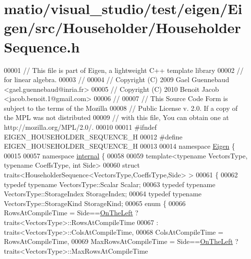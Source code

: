 \hypertarget{matio_2visual__studio_2test_2eigen_2_eigen_2src_2_householder_2_householder_sequence_8h_source}{}\section{matio/visual\+\_\+studio/test/eigen/\+Eigen/src/\+Householder/\+Householder\+Sequence.h}
\label{matio_2visual__studio_2test_2eigen_2_eigen_2src_2_householder_2_householder_sequence_8h_source}

\begin{DoxyCode}
00001 \textcolor{comment}{// This file is part of Eigen, a lightweight C++ template library}
00002 \textcolor{comment}{// for linear algebra.}
00003 \textcolor{comment}{//}
00004 \textcolor{comment}{// Copyright (C) 2009 Gael Guennebaud <gael.guennebaud@inria.fr>}
00005 \textcolor{comment}{// Copyright (C) 2010 Benoit Jacob <jacob.benoit.1@gmail.com>}
00006 \textcolor{comment}{//}
00007 \textcolor{comment}{// This Source Code Form is subject to the terms of the Mozilla}
00008 \textcolor{comment}{// Public License v. 2.0. If a copy of the MPL was not distributed}
00009 \textcolor{comment}{// with this file, You can obtain one at http://mozilla.org/MPL/2.0/.}
00010 
00011 \textcolor{preprocessor}{#ifndef EIGEN\_HOUSEHOLDER\_SEQUENCE\_H}
00012 \textcolor{preprocessor}{#define EIGEN\_HOUSEHOLDER\_SEQUENCE\_H}
00013 
00014 \textcolor{keyword}{namespace }\hyperlink{namespace_eigen}{Eigen} \{ 
00015 
00057 \textcolor{keyword}{namespace }\hyperlink{namespaceinternal}{internal} \{
00058 
00059 \textcolor{keyword}{template}<\textcolor{keyword}{typename} VectorsType, \textcolor{keyword}{typename} CoeffsType, \textcolor{keywordtype}{int} S\textcolor{keywordtype}{id}e>
00060 \textcolor{keyword}{struct }traits<HouseholderSequence<VectorsType,CoeffsType,Side> >
00061 \{
00062   \textcolor{keyword}{typedef} \textcolor{keyword}{typename} VectorsType::Scalar Scalar;
00063   \textcolor{keyword}{typedef} \textcolor{keyword}{typename} VectorsType::StorageIndex StorageIndex;
00064   \textcolor{keyword}{typedef} \textcolor{keyword}{typename} VectorsType::StorageKind StorageKind;
00065   \textcolor{keyword}{enum} \{
00066     RowsAtCompileTime = Side==\hyperlink{group__enums_ggac22de43beeac7a78b384f99bed5cee0ba129609b3bdf23b071f5f86cf2f995ec4}{OnTheLeft} ? traits<VectorsType>::RowsAtCompileTime
00067                                         : traits<VectorsType>::ColsAtCompileTime,
00068     ColsAtCompileTime = RowsAtCompileTime,
00069     MaxRowsAtCompileTime = Side==\hyperlink{group__enums_ggac22de43beeac7a78b384f99bed5cee0ba129609b3bdf23b071f5f86cf2f995ec4}{OnTheLeft} ? traits<VectorsType>::MaxRowsAtCompileTime

\end{DoxyCode}
